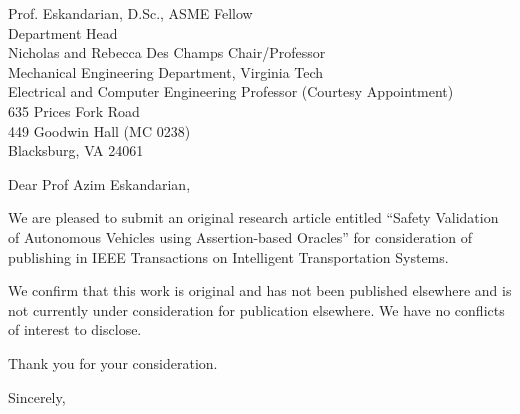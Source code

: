 \documentclass[11pt, a4paper]{letter} %
\begin{document}

\begin{letter}{
	Prof. Eskandarian, D.Sc., ASME Fellow\\
	Department Head\\
	Nicholas and Rebecca Des Champs Chair/Professor \\
	Mechanical Engineering Department, Virginia Tech\\
	Electrical and Computer Engineering Professor (Courtesy Appointment)\\
	635 Prices Fork Road\\ 
	449 Goodwin Hall (MC 0238)\\
	Blacksburg, VA 24061\\
}


\opening{Dear Prof Azim Eskandarian,}

We are pleased to submit an original research article entitled “Safety Validation of Autonomous Vehicles using Assertion-based Oracles” for consideration of publishing in IEEE Transactions on Intelligent Transportation Systems. 

We confirm that this work is original and has not been published elsewhere and is not currently under consideration for publication elsewhere. We have no conflicts of interest to disclose. 

Thank you for your consideration. 

\closing{Sincerely,}






\end{letter}
\end{document}
